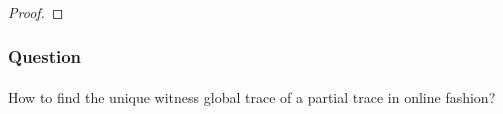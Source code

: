 \documentclass{beamer}
\begin{document}
\begin{frame}
\frametitle{}
 \framesubtitle{}



\begin{proof}
\tiny
%

\end{proof}

\end{frame}

\begin{frame}
\frametitle{Question}
 \framesubtitle{}
\begin{mdframed}[backgroundcolor=yellow]
\center
How to find the unique witness global trace of a partial trace in online fashion?
\end{mdframed}

\end{frame}

\end{document}
